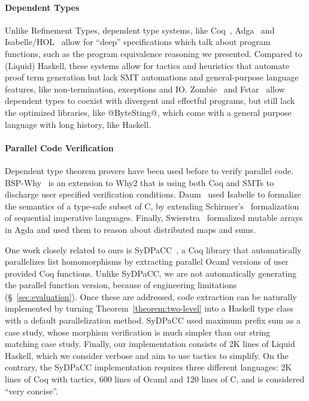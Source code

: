\paragraph{Dependent Types}
Unlike Refinement Types, dependent type systems,
like Coq~\cite{coq-book}, Adga~\cite{agda} and Isabelle/HOL~\cite{isabelle} allow for ``deep'' specifications
which talk about program functions,
such as the program equivalence reasoning we presented.
%
Compared to (Liquid) Haskell,
these systems allow for tactics and heuristics
that automate proof term generation
but lack SMT automations and
general-purpose language features,
like non-termination, exceptions and IO.
%
Zombie~\cite{Zombie,Sjoberg2015} and Fstar~\cite{fstar} allow dependent types to
coexist with divergent and effectful programs,
but still lack the optimized libraries,
like @ByteSting@, which come
with a general purpose language
with long history, like Haskell.



\paragraph{Parallel Code Verification}
Dependent type theorem provers have been used before to
verify parallel code.
%
BSP-Why~\cite{bspwhy} is an extension to Why2 that is using both Coq and SMTs
to discharge user specified verification conditions.
%
Daum~\cite{daum07} used Isabelle to formalize the semantics
of a type-safe subset of C, 
by extending Schirmer's~\cite{schirmer06}
formalization of sequential imperative languages.
%
Finally, Swierstra~\cite{wouter10} formalized mutable arrays in Agda
and used them to reason about distributed maps and sums.

One work  closely related to ours is
SyDPaCC~\cite{SyDPaCC}, a Coq library that
automatically parallelizes list homomorphisms
by extracting parallel Ocaml versions of user provided Coq functions.
%
Unlike SyDPaCC, we are not automatically generating the parallel
function version, because of engineering limitations
(\S~\ref{sec:evaluation}).  Once these are addressed, code extraction
can be naturally implemented by turning
Theorem~\ref{theorem:two-level} into a Haskell type class with a
default parallelization method.
%
SyDPaCC used maximum prefix sum as a case study,
whose morphism verification is
much simpler than our string matching case study.
%
Finally, our implementation consists of
2K lines of Liquid Haskell, which we consider verbose and aim to
use tactics to simplify.
On the contrary, the SyDPaCC implementation
requires three different languages:
2K lines of Coq with tactics, 600 lines of Ocaml and 120 lines of C,
and is considered ``very concise''.


